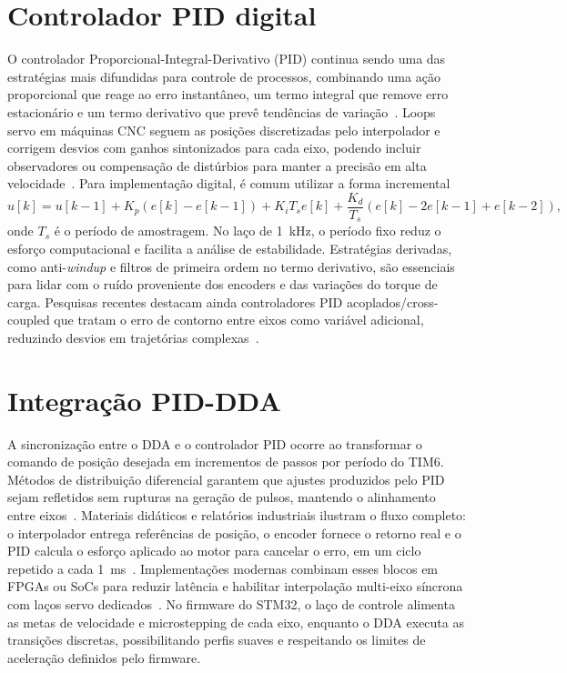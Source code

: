 \section{Controlador PID digital}

O controlador Proporcional-Integral-Derivativo (PID) continua sendo uma
das estratégias mais difundidas para controle de processos, combinando
uma ação proporcional que reage ao erro instantâneo, um termo integral
que remove erro estacionário e um termo derivativo que prevê tendências
de variação~\cite{astrom1995}. Loops servo em máquinas CNC seguem as
posições discretizadas pelo interpolador e corrigem desvios com ganhos
sintonizados para cada eixo, podendo incluir observadores ou compensação
de distúrbios para manter a precisão em alta velocidade~\cite{efficient_reference,real_time_interpolators,kung_fpga_motion}.
Para implementação digital, é comum utilizar a forma incremental
\begin{equation}
    u[k] = u[k-1] + K_p(e[k] - e[k-1]) + K_i T_s e[k] + \frac{K_d}{T_s}(e[k] - 2e[k-1] + e[k-2]),
\end{equation}
onde $T_s$ é o período de amostragem. No laço de \SI{1}{\kilo\hertz}, o
período fixo reduz o esforço computacional e facilita a análise de
estabilidade. Estratégias derivadas, como anti-\emph{windup} e filtros de
primeira ordem no termo derivativo, são essenciais para lidar com o
ruído proveniente dos encoders e das variações do torque de
carga. Pesquisas recentes destacam ainda controladores PID
acoplados/cross-coupled que tratam o erro de contorno entre eixos como
variável adicional, reduzindo desvios em trajetórias complexas~\cite{adaptive_fuzzy_pid}.

\section{Integração PID-DDA}

A sincronização entre o DDA e o controlador PID ocorre ao transformar o
comando de posição desejada em incrementos de passos por período do TIM6.
Métodos de distribuição diferencial garantem que ajustes produzidos pelo
PID sejam refletidos sem rupturas na geração de pulsos, mantendo o
alinhamento entre eixos~\cite{mori2005dda,efficient_reference}. Materiais
didáticos e relatórios industriais ilustram o fluxo completo: o
interpolador entrega referências de posição, o encoder fornece o retorno
real e o PID calcula o esforço aplicado ao motor para cancelar o erro, em
um ciclo repetido a cada \SI{1}{\milli\second}~\cite{idc_cnc_interp,unit3_interpolators}.
Implementações modernas combinam esses blocos em FPGAs ou SoCs para
reduzir latência e habilitar interpolação multi-eixo síncrona com laços
servo dedicados~\cite{kung_fpga_motion,real_time_interpolators}. No
firmware do STM32, o laço de controle alimenta as metas de velocidade e
microstepping de cada eixo, enquanto o DDA executa as transições
discretas, possibilitando perfis suaves e respeitando os limites de
aceleração definidos pelo firmware.

